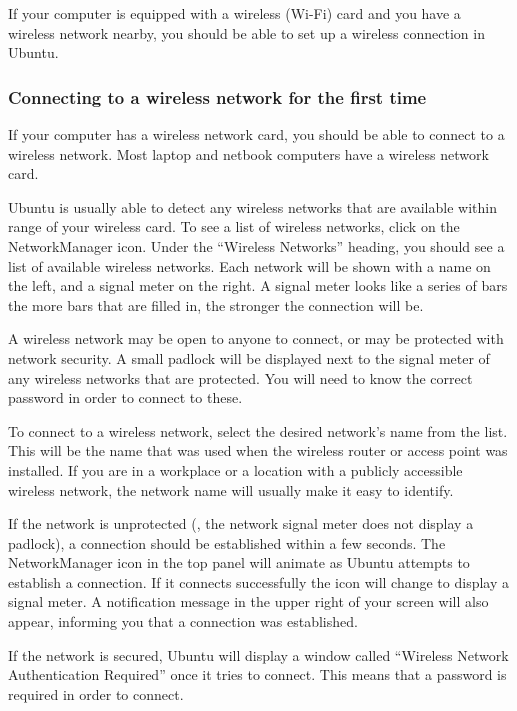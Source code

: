 If your computer is equipped with a wireless (Wi-Fi) card and you 
have a wireless network nearby, you should be able to set up a wireless
connection in Ubuntu.

\subsubsection{Connecting to a wireless network for the first time}

If your computer has a wireless network card, you should be able to 
connect to a wireless network. Most laptop and netbook computers
have a wireless network card.

Ubuntu is usually able to detect any wireless networks that are available within range of your wireless card. To see a list of wireless networks, click on the NetworkManager icon. Under the 
``Wireless Networks'' heading, you should see a list of available wireless
networks. Each network will be shown with a name on the left, and a signal meter
on the right. A signal meter looks like a series of bars \dash the more
bars that are filled in, the stronger the connection will be.

A wireless network may be open to anyone to connect, or may be protected
with network security. A small padlock will be displayed next to the signal meter of any wireless networks that are protected. You will need to know the correct password in order to connect to these.

To connect to a wireless network, select the desired network's name from the list. This will be the name that was used when the wireless router or access point was installed. If you are in a workplace or a location with a publicly accessible wireless network, the network name will usually make it easy to identify.

If the network is unprotected (\ie, the network signal meter does not display a padlock), a connection should be established within a few seconds. The NetworkManager icon in the top panel will animate as Ubuntu attempts to establish a connection. If it connects successfully the icon will change to display a signal meter. A notification message in the upper right of your screen will also appear, informing you that a connection was established.

If the network is secured, Ubuntu will display a window called ``Wireless Network Authentication Required'' once it tries to connect. This means that a password is required in order to connect.

